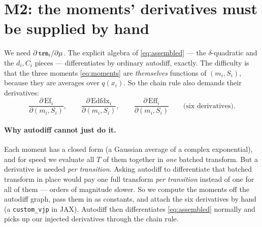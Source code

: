 \documentclass[11pt]{article}
\newcommand{\code}[1]{\texttt{\small #1}}
\begin{document}
\section{M2: the moments' derivatives must be supplied by hand}

We need $\partial\,\code{trm}_i/\partial\mu$. The explicit algebra of
\eqref{eq:assembled} --- the $\delta$-quadratic and the $d_i,C_i$ pieces
--- differentiates by ordinary autodiff, exactly. The difficulty is that
the three moments \eqref{eq:moments} are \emph{themselves} functions of
$(m_i,S_i)$, because they are averages over $q(x_i)$. So the chain rule
also demands their derivatives:
\begin{equation}
\frac{\partial\,\mathrm{Ef}_i}{\partial(m_i,S_i)},\qquad
\frac{\partial\,\mathrm{Edfdx}_i}{\partial(m_i,S_i)},\qquad
\frac{\partial\,\mathrm{Eff}_i}{\partial(m_i,S_i)}
\qquad\text{(six derivatives).}
\label{eq:six-slots}
\end{equation}

\paragraph{Why autodiff cannot just do it.}
Each moment has a closed form (a Gaussian average of a complex
exponential), and for speed we evaluate all $T$ of them together in
\emph{one} batched transform. But a derivative is needed
\emph{per transition}. Asking autodiff to differentiate that batched
transform in place would pay one full transform \emph{per transition}
instead of one for all of them --- orders of magnitude slower. So we
compute the moments off the autodiff graph, pass them in as constants,
and attach the six derivatives by hand (a \code{custom\_vjp} in JAX).
Autodiff then differentiates \eqref{eq:assembled} normally and picks up
our injected derivatives through the chain rule.
\end{document}
